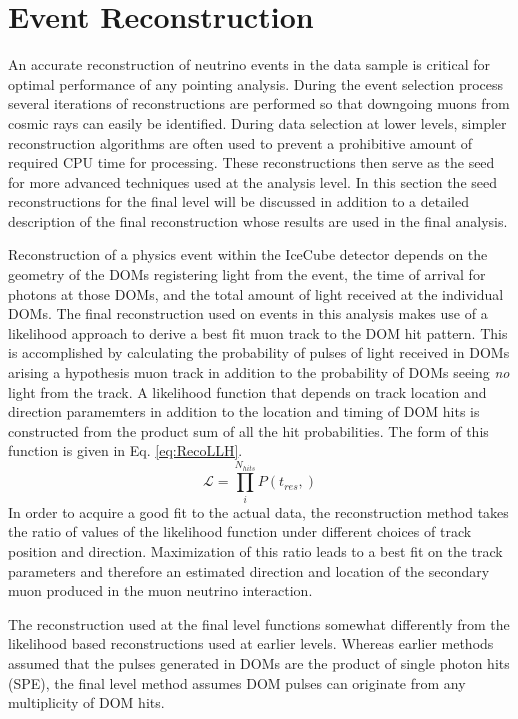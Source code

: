 \documentclass{gatech-thesis}
\begin{document}
\section{Event Reconstruction}
An accurate reconstruction of neutrino events in the data sample is critical for optimal performance of any pointing analysis. During the event selection process several iterations of reconstructions are performed so that downgoing muons from cosmic rays can easily be identified. During data selection at lower levels, simpler reconstruction algorithms are often used to prevent a prohibitive amount of required CPU time for processing. These reconstructions then serve as the seed for more advanced techniques used at the analysis level. In this section the seed reconstructions for the final level will be discussed in addition to a detailed description of the final reconstruction whose results are used in the final analysis.

Reconstruction of a physics event within the IceCube detector depends on the geometry of the DOMs registering light from the event, the time of arrival for photons at those DOMs, and the total amount of light received at the individual DOMs. The final reconstruction used on events in this analysis makes use of a likelihood approach to derive a best fit muon track to the DOM hit pattern. This is accomplished by calculating the probability of pulses of light received in DOMs arising a hypothesis muon track in addition to the probability of DOMs seeing \textit{no} light from the track. A likelihood function that depends on track location and direction paramemters in addition to the location and timing of DOM hits is constructed from the product sum of all the hit probabilities. The form of this function is given in Eq. \ref{eq:RecoLLH}.
\begin{equation}
\label{eq:RecoLLH}
\mathcal{L} = \prod_{i}^{N_{hits}} P(t_{res},)
\end{equation}
In order to acquire a good fit to the actual data, the reconstruction method takes the ratio of values of the likelihood function under different choices of track position and direction. Maximization of this ratio leads to a best fit on the track parameters and therefore an estimated direction and location of the secondary muon produced in the muon neutrino interaction.

The reconstruction used at the final level functions somewhat differently from the likelihood based reconstructions used at earlier levels. Whereas earlier methods assumed that the pulses generated in DOMs are the product of single photon hits (SPE), the final level method assumes DOM pulses can originate from any multiplicity of DOM hits.
\end{document}
